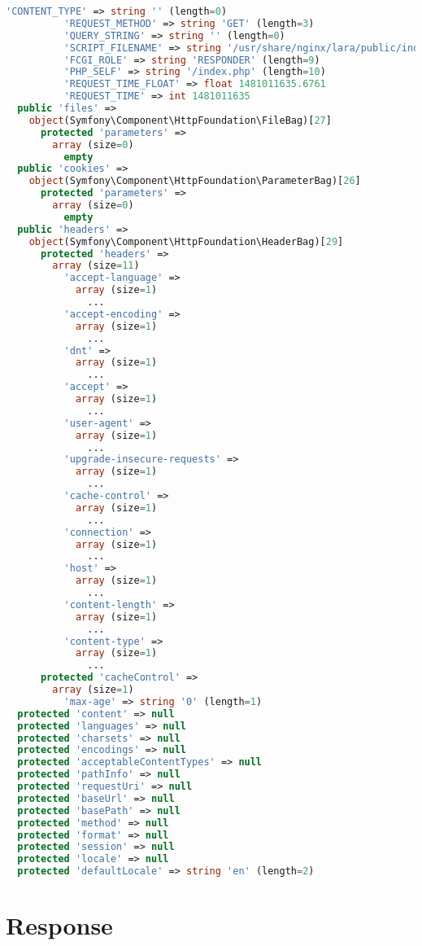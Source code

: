 \begin{lstlisting}[language=PHP]
          'CONTENT_TYPE' => string '' (length=0)
          'REQUEST_METHOD' => string 'GET' (length=3)
          'QUERY_STRING' => string '' (length=0)
          'SCRIPT_FILENAME' => string '/usr/share/nginx/lara/public/index.php' (length=38)
          'FCGI_ROLE' => string 'RESPONDER' (length=9)
          'PHP_SELF' => string '/index.php' (length=10)
          'REQUEST_TIME_FLOAT' => float 1481011635.6761
          'REQUEST_TIME' => int 1481011635
  public 'files' => 
    object(Symfony\Component\HttpFoundation\FileBag)[27]
      protected 'parameters' => 
        array (size=0)
          empty
  public 'cookies' => 
    object(Symfony\Component\HttpFoundation\ParameterBag)[26]
      protected 'parameters' => 
        array (size=0)
          empty
  public 'headers' => 
    object(Symfony\Component\HttpFoundation\HeaderBag)[29]
      protected 'headers' => 
        array (size=11)
          'accept-language' => 
            array (size=1)
              ...
          'accept-encoding' => 
            array (size=1)
              ...
          'dnt' => 
            array (size=1)
              ...
          'accept' => 
            array (size=1)
              ...
          'user-agent' => 
            array (size=1)
              ...
          'upgrade-insecure-requests' => 
            array (size=1)
              ...
          'cache-control' => 
            array (size=1)
              ...
          'connection' => 
            array (size=1)
              ...
          'host' => 
            array (size=1)
              ...
          'content-length' => 
            array (size=1)
              ...
          'content-type' => 
            array (size=1)
              ...
      protected 'cacheControl' => 
        array (size=1)
          'max-age' => string '0' (length=1)
  protected 'content' => null
  protected 'languages' => null
  protected 'charsets' => null
  protected 'encodings' => null
  protected 'acceptableContentTypes' => null
  protected 'pathInfo' => null
  protected 'requestUri' => null
  protected 'baseUrl' => null
  protected 'basePath' => null
  protected 'method' => null
  protected 'format' => null
  protected 'session' => null
  protected 'locale' => null
  protected 'defaultLocale' => string 'en' (length=2)
\end{lstlisting}

\section{Response}


